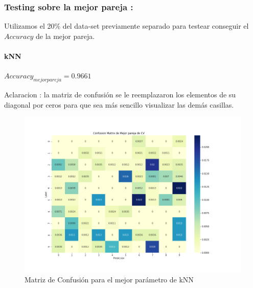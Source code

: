 \subsubsection{ Testing sobre la mejor pareja : }


Utilizamos el 20$\%$ del data-set previamente separado para testear conseguir el $Accuracy$ de la mejor pareja.

\paragraph{kNN}

$Accuracy_{mejor pareja} = 0.9661 $
\par
\vspace{0.5cm}
Aclaracion : la matriz de confusión se le reemplazaron los elementos de su diagonal por ceros para que sea más sencillo visualizar las demás casillas.
\begin{figure}[H]
    \centering
    \includegraphics[width=14cm]{images/ConfMatrix_knn.png}%
    \qquad
    \caption{Matriz de Confusión para el mejor parámetro de kNN }
    \label{knn_MatrizConf}%
\end{figure}



